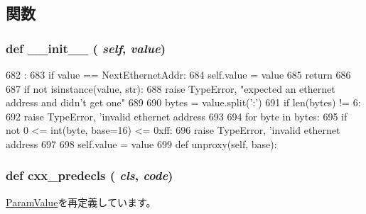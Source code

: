 \subsection{関数}
\hypertarget{classm5_1_1params_1_1EthernetAddr_ac775ee34451fdfa742b318538164070e}{
\subsubsection[{\_\-\_\-init\_\-\_\-}]{\setlength{\rightskip}{0pt plus 5cm}def \_\-\_\-init\_\-\_\- ( {\em self}, \/   {\em value})}}
\label{classm5_1_1params_1_1EthernetAddr_ac775ee34451fdfa742b318538164070e}



\begin{DoxyCode}
682                              :
683         if value == NextEthernetAddr:
684             self.value = value
685             return
686 
687         if not isinstance(value, str):
688             raise TypeError, "expected an ethernet address and didn't get one"
689 
690         bytes = value.split(':')
691         if len(bytes) != 6:
692             raise TypeError, 'invalid ethernet address %
693 
694         for byte in bytes:
695             if not 0 <= int(byte, base=16) <= 0xff:
696                 raise TypeError, 'invalid ethernet address %
697 
698         self.value = value
699 
    def unproxy(self, base):
\end{DoxyCode}
\hypertarget{classm5_1_1params_1_1EthernetAddr_a0b408a11a14bd1d770e28f71a6e14ab5}{
\subsubsection[{cxx\_\-predecls}]{\setlength{\rightskip}{0pt plus 5cm}def cxx\_\-predecls ( {\em cls}, \/   {\em code})}}
\label{classm5_1_1params_1_1EthernetAddr_a0b408a11a14bd1d770e28f71a6e14ab5}


\hyperlink{classm5_1_1params_1_1ParamValue_a0b408a11a14bd1d770e28f71a6e14ab5}{ParamValue}を再定義しています。


